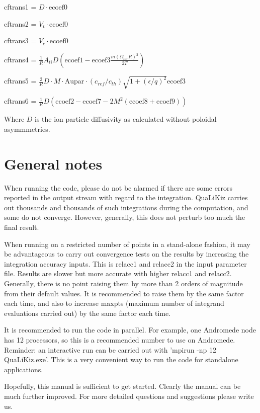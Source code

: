 \documentclass{article}
\begin{document}
\begin{description}
cftrans1 = $D{\cdot}\mathrm{ecoef0}$ 

cftrans2 = $V_t{\cdot}\mathrm{ecoef0}$

cftrans3 = $V_c{\cdot}\mathrm{ecoef0}$ 

cftrans4 = $\frac{1}{R}A_{ti}D(\mathrm{ecoef1}-\mathrm{ecoef3}\frac{m({\Omega_{tor}}R)^2}{2T})$

cftrans5 = $\frac{2}{R}D{\cdot}M{\cdot}\mathrm{Aupar}{\cdot}(c_{ref}/c_{th})\sqrt{1+(\epsilon/q)^2}\mathrm{ecoef3}$

cftrans6 = $\frac{1}{R}D(\mathrm{ecoef2} - \mathrm{ecoef7} - 2M^2( \mathrm{ecoef8} + \mathrm{ecoef9}))$

Where $D$ is the ion particle diffusivity as calculated without poloidal asymmmetries. 

\end{description} 

\section{General notes}
When running the code, please do not be alarmed if there are some errors reported in the output stream with regard to the integration. QuaLiKiz carries out thousands and thousands of such integrations during the
computation, and some do not converge. However, generally, this does not perturb too much the final result. 

When running on a restricted number of points in a stand-alone fashion, it may be advantageous to carry out convergence tests on the results by increasing the integration accuracy inputs. This is relacc1 and relacc2 in
the input parameter file. Results are slower but more accurate with higher relacc1 and relacc2. Generally, there is no point raising them by more than 2 orders of magnitude from their default values. It is recommended to
raise them by the same factor each time, and also to increase maxpts (maximum number of integrand evaluations carried out) by the same factor each time.

It is recommended to run the code in parallel. For example, one Andromede node has 12 processors, so this is a recommended number to use on Andromede. Reminder: an interactive run can be carried out with 'mpirun -np 12 QuaLiKiz.exe'. This is a very convenient way to run the code for standalone applications.

Hopefully, this manual is sufficient to get started. Clearly the manual can be much further improved. For more detailed questions and suggestions please write us.
\end{document}
